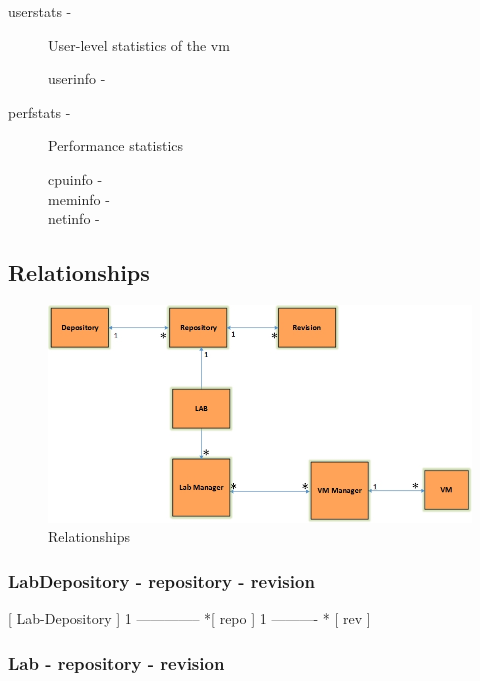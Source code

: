 \documentclass[11pt]{article}
\begin{document}
\begin{description}
\begin{description}
\begin{description}
\item [userstats -] User-level statistics of the vm

\begin{description}
\item [userinfo -]
\end{description}

\item [perfstats -] Performance statistics

\begin{description}
\item [cpuinfo -]
\item [meminfo -]
\item [netinfo -]
\end{description}

\end{description}

\end{description}

\end{description}
\subsection{Relationships}
\label{sec-3.3}


\begin{figure}[H]
\centering
\includegraphics[width=12cm]{relationships.jpg}
\caption{Relationships}
\end{figure}

\subsubsection{LabDepository - repository - revision}
\label{sec-3.3.1}


 [ Lab-Depository ] 1 -------------- *[ repo ] 1 ---------- * [ rev ]

\subsubsection{Lab - repository - revision}
\label{sec-3.3.2}
\end{document}
